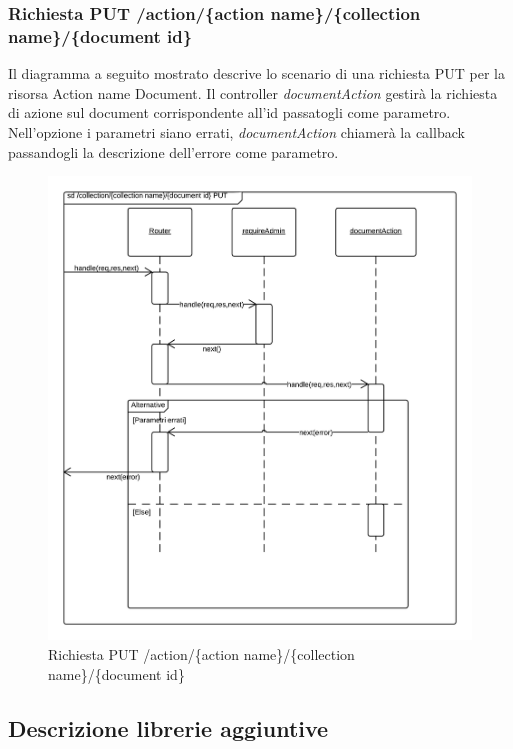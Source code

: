\subsubsection{Richiesta PUT /action/\{action name\}/\{collection name\}/\{document id\}}
Il diagramma a seguito mostrato descrive lo scenario di una richiesta PUT per la risorsa Action name Document.
Il controller \emph{documentAction} gestirà la richiesta di azione sul document corrispondente all'id passatogli come parametro.
Nell'opzione i parametri siano errati, \emph{documentAction} chiamerà la callback passandogli la descrizione dell'errore come parametro.
\begin{figure}[H]
	\begin{center} 
		\includegraphics[scale=0.20]{scenari/Action Name Collection Document PUT.png} 
		\caption{Richiesta PUT /action/\{action name\}/\{collection name\}/\{document id\}}
	\end{center} 
\end{figure}

\clearpage
\subsection{Descrizione librerie aggiuntive}

